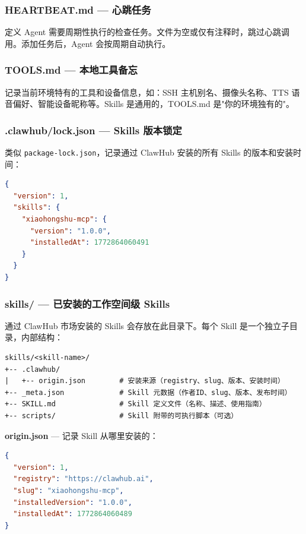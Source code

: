 \subsubsection{HEARTBEAT.md --- 心跳任务}


定义 Agent 需要周期性执行的检查任务。文件为空或仅有注释时，跳过心跳调用。添加任务后，Agent 会按周期自动执行。

\subsubsection{TOOLS.md --- 本地工具备忘}


记录当前环境特有的工具和设备信息，如：SSH 主机别名、摄像头名称、TTS 语音偏好、智能设备昵称等。Skills 是通用的，TOOLS.md 是"你的环境独有的"。

\subsubsection{.clawhub/lock.json --- Skills 版本锁定}


类似 \texttt{package-lock.json}，记录通过 ClawHub 安装的所有 Skills 的版本和安装时间：

\begin{lstlisting}[language=json]
{
  "version": 1,
  "skills": {
    "xiaohongshu-mcp": {
      "version": "1.0.0",
      "installedAt": 1772864060491
    }
  }
}
\end{lstlisting}

\subsubsection{skills/ --- 已安装的工作空间级 Skills}


通过 ClawHub 市场安装的 Skills 会存放在此目录下。每个 Skill 是一个独立子目录，内部结构：

\begin{lstlisting}
skills/<skill-name>/
+-- .clawhub/
|   +-- origin.json        # 安装来源（registry、slug、版本、安装时间）
+-- _meta.json             # Skill 元数据（作者ID、slug、版本、发布时间）
+-- SKILL.md               # Skill 定义文件（名称、描述、使用指南）
+-- scripts/               # Skill 附带的可执行脚本（可选）
\end{lstlisting}

\textbf{origin.json} --- 记录 Skill 从哪里安装的：

\begin{lstlisting}[language=json]
{
  "version": 1,
  "registry": "https://clawhub.ai",
  "slug": "xiaohongshu-mcp",
  "installedVersion": "1.0.0",
  "installedAt": 1772864060489
}
\end{lstlisting}

